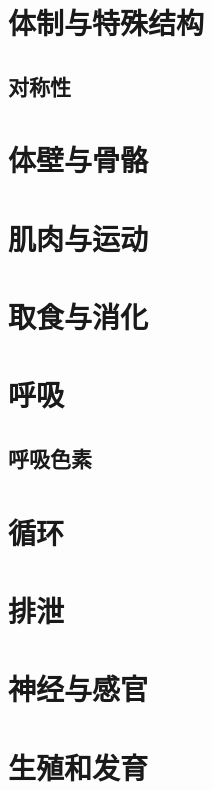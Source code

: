 \section{体制与特殊结构}

\subsection{对称性}


\section{体壁与骨骼}

\section{肌肉与运动}

\section{取食与消化}

\section{呼吸}

\subsection{呼吸色素}



\section{循环}

\section{排泄}

\section{神经与感官}

\section{生殖和发育}